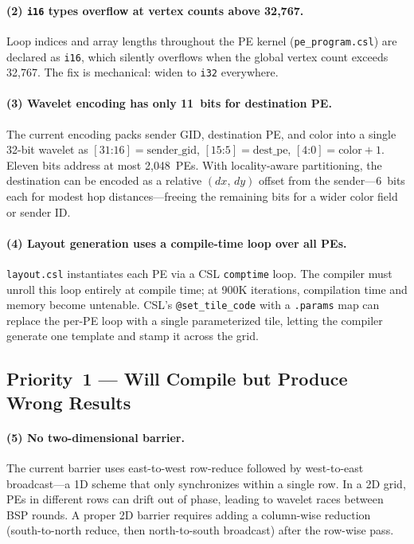 \documentclass[11pt,letterpaper]{article}
\begin{document}
\paragraph{(2) \texttt{i16} types overflow at vertex counts above 32{,}767.}
Loop indices and array lengths throughout the PE kernel
(\texttt{pe\_program.csl}) are declared as \texttt{i16},
which silently overflows when the global vertex count exceeds 32{,}767.
The fix is mechanical: widen to \texttt{i32} everywhere.

\paragraph{(3) Wavelet encoding has only 11~bits for destination PE.}
The current encoding packs sender GID, destination PE,
and color into a single 32-bit wavelet as
$[\text{31:16}] = \text{sender\_gid}$, $[\text{15:5}] = \text{dest\_pe}$,
$[\text{4:0}] = \text{color}+1$.
Eleven bits address at most 2{,}048~PEs.
With locality-aware partitioning, the destination can be encoded as
a relative $(dx,\,dy)$ offset from the sender---6~bits each for modest hop distances---freeing
the remaining bits for a wider color field or sender ID.

\paragraph{(4) Layout generation uses a compile-time loop over all PEs.}
\texttt{layout.csl} instantiates each PE via a CSL \texttt{comptime} loop.
The compiler must unroll this loop entirely at compile time;
at 900K iterations, compilation time and memory become untenable.
CSL's \texttt{@set\_tile\_code} with a \texttt{.params} map
can replace the per-PE loop with a single parameterized tile,
letting the compiler generate one template and stamp it across the grid.

\subsection{Priority~1 --- Will Compile but Produce Wrong Results}

\paragraph{(5) No two-dimensional barrier.}
The current barrier uses east-to-west row-reduce followed by
west-to-east broadcast---a 1D scheme that only synchronizes within a single row.
In a 2D grid, PEs in different rows can drift out of phase,
leading to wavelet races between BSP rounds.
A proper 2D barrier requires adding a column-wise reduction
(south-to-north reduce, then north-to-south broadcast)
after the row-wise pass.
\end{document}

